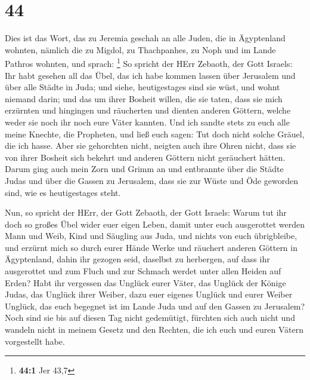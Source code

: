 \hypertarget{section-43}{%
\section{44}\label{section-43}}

 Dies ist das Wort, das zu Jeremia geschah an alle Juden,
die in Ägyptenland wohnten, nämlich die zu Migdol, zu Thachpanhes, zu
Noph und im Lande Pathros wohnten, und sprach: \footnote{\textbf{44:1}
  Jer 43,7}  So spricht der HErr Zebaoth, der Gott
Israels: Ihr habt gesehen all das Übel, das ich habe kommen lassen über
Jerusalem und über alle Städte in Juda; und siehe, heutigestages sind
sie wüst, und wohnt niemand darin;  und das um ihrer
Bosheit willen, die sie taten, dass sie mich erzürnten und hingingen und
räucherten und dienten anderen Göttern, welche weder sie noch ihr noch
eure Väter kannten.  Und ich sandte stets zu euch alle
meine Knechte, die Propheten, und ließ euch sagen: Tut doch nicht solche
Gräuel, die ich hasse.  Aber sie gehorchten nicht, neigten
auch ihre Ohren nicht, dass sie von ihrer Bosheit sich bekehrt und
anderen Göttern nicht geräuchert hätten.  Darum ging auch
mein Zorn und Grimm an und entbrannte über die Städte Judas und über die
Gassen zu Jerusalem, dass sie zur Wüste und Öde geworden sind, wie es
heutigestages steht.

 Nun, so spricht der HErr, der Gott Zebaoth, der Gott
Israels: Warum tut ihr doch so großes Übel wider euer eigen Leben, damit
unter euch ausgerottet werden Mann und Weib, Kind und Säugling aus Juda,
und nichts von euch übrigbleibe,  und erzürnt mich so
durch eurer Hände Werke und räuchert anderen Göttern in Ägyptenland,
dahin ihr gezogen seid, daselbst zu herbergen, auf dass ihr ausgerottet
und zum Fluch und zur Schmach werdet unter allen Heiden auf Erden?
 Habt ihr vergessen das Unglück eurer Väter, das Unglück
der Könige Judas, das Unglück ihrer Weiber, dazu euer eigenes Unglück
und eurer Weiber Unglück, das euch begegnet ist im Lande Juda und auf
den Gassen zu Jerusalem?  Noch sind sie bis auf diesen
Tag nicht gedemütigt, fürchten sich auch nicht und wandeln nicht in
meinem Gesetz und den Rechten, die ich euch und euren Vätern vorgestellt
habe.

